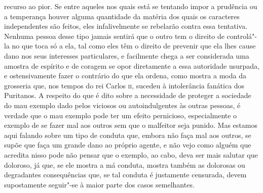 recurso ao pior. Se entre aqueles nos quais está se tentando impor a
prudência ou a temperança houver alguma quantidade da matéria dos quais os
caracteres independentes são feitos, eles infalivelmente se rebelarão
contra essa tentativa. Nenhuma pessoa desse tipo jamais sentirá que o
outro tem o direito de controlá"-la no que toca só a ela, tal como
eles têm o direito de prevenir que ela lhes cause dano nos seus
interesses particulares, e facilmente chega a ser considerada uma
amostra de espírito e de coragem se opor diretamente a essa autoridade
usurpada, e ostensivamente fazer o contrário do que ela ordena, como
mostra a moda da grosseria que, nos tempos do rei Carlos \textsc{ii}, sucedeu à
intolerância fanática dos Puritanos. A respeito do que é dito sobre a
necessidade de proteger a sociedade do mau exemplo dado pelos viciosos
ou autoindulgentes às outras pessoas, é verdade que o mau exemplo
pode ter um efeito pernicioso, especialmente o exemplo de se fazer mal
aos outros sem que o malfeitor seja punido. Mas estamos aqui falando sobre um
tipo de conduta que, embora não faça mal aos outros, se supõe que faça um
grande dano ao próprio agente, e não vejo como alguém que acredita
nisso pode não pensar que o exemplo, ao cabo, deva
ser mais salutar que doloroso, já que, se ele mostra a má conduta,
mostra também as dolorosas ou degradantes consequências que, se tal
conduta é justamente censurada, devem supostamente seguir"-se à maior
parte dos casos semelhantes. 

